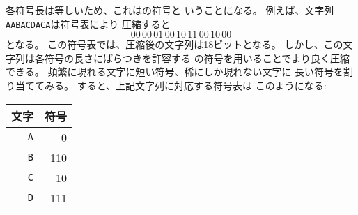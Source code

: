 \begin{comment}
This is a \key{constant-length} code
which means that the length of each
codeword is the same.
For example, we can compress the string
\texttt{AABACDACA} as follows:
\[00\,00\,01\,00\,10\,11\,00\,10\,00\]
Using this code, the length of the compressed
string is 18 bits.
However, we can compress the string better
if we use a \key{variable-length} code
where codewords may have different lengths.
Then we can give short codewords for
characters that appear often
and long codewords for characters
that appear rarely.
It turns out that an \key{optimal} code
for the above string is as follows:
\begin{center}
\begin{tabular}{rr}
character & codeword \\
\hline
\texttt{A} & 0 \\
\texttt{B} & 110 \\
\texttt{C} & 10 \\
\texttt{D} & 111 \\
\end{tabular}
\end{center}
\end{comment}

各符号長は等しいため、これはの符号と
いうことになる。
例えば、文字列\texttt{AABACDACA}は符号表により
圧縮すると\[00\,00\,01\,00\,10\,11\,00\,10\,00\]となる。
この符号表では、圧縮後の文字列は18ビットとなる。
しかし、この文字列は各符号の長さにばらつきを許容する
の符号を用いることでより良く圧縮できる。
頻繁に現れる文字に短い符号、稀にしか現れない文字に
長い符号を割り当ててみる。
すると、上記文字列に対応する符号表は
このようになる:
\begin{center}
\begin{tabular}{rr}
文字 & 符号 \\
\hline
\texttt{A} & 0 \\
\texttt{B} & 110 \\
\texttt{C} & 10 \\
\texttt{D} & 111 \\
\end{tabular}
\end{center}

\begin{comment}
An optimal code produces a compressed string
that is as short as possible.
In this case, the compressed string using
the optimal code is
\[0\,0\,110\,0\,10\,111\,0\,10\,0,\]
so only 15 bits are needed instead of 18 bits.
Thus, thanks to a better code it was possible to
save 3 bits in the compressed string.
\end{comment}

